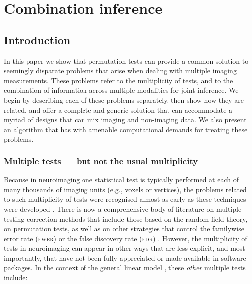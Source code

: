 \chapter{Combination inference}
\label{sec:comb:combination}
\setstretch{\lspac}





\section{Introduction}
\label{sec:comb:intro}

In this paper we show that permutation tests can provide a common solution to seemingly disparate problems that arise when dealing with multiple imaging measurements. These problems refer to the multiplicity of tests, and to the combination of information across multiple modalities for joint inference. We begin by describing each of these problems separately, then show how they are related, and offer a complete and generic solution that can accommodate a myriad of designs that can mix imaging and non-imaging data. We also present an algorithm that has with amenable computational demands for treating these problems.

\subsection{Multiple tests --- but not the usual multiplicity}

Because in neuroimaging one statistical test is typically performed at each of many thousands of imaging units (e.g., voxels or vertices), the problems related to such multiplicity of tests were recognised almost as early as these techniques were developed \citep[for pioneering examples, see][]{Fox1988, Friston1991}. There is now a comprehensive body of literature on multiple testing correction methods that include those based on the random field theory, on permutation tests, as well as on other strategies that control the familywise error rate (\textsc{fwer}) or the false discovery rate (\textsc{fdr}) \citep[for reviews, see][]{Nichols2003, Nichols2012}. However, the multiplicity of tests in neuroimaging can appear in other ways that are less explicit, and most importantly, that have not been fully appreciated or made available in software packages. In the context of the general linear model \citep[\textsc{glm},][]{Scheffe1959}, these \emph{other} multiple tests include:

